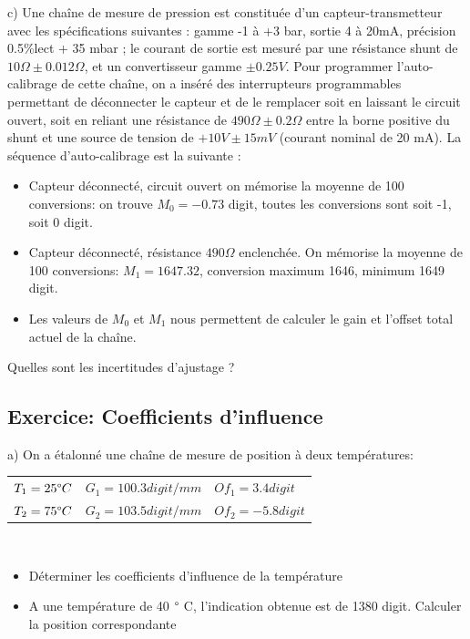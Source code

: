 \documentclass[main.tex]{subfiles}
\begin{document}
c)	Une chaîne de mesure de pression est constituée d'un capteur-transmetteur avec les spécifications suivantes : gamme -1 à +3 bar, sortie 4 à 20mA, précision 0.5\%lect + 35 mbar ; le courant de sortie est mesuré par une résistance shunt de $10 \Omega \pm 0.012 \Omega$, et un convertisseur gamme $\pm 0.25V$.
Pour programmer l'auto-calibrage de cette chaîne, on a inséré des interrupteurs programmables permettant de déconnecter le capteur et de le remplacer soit en laissant le circuit ouvert, soit en reliant une résistance de $490 \Omega \pm 0.2 \Omega$ entre la borne positive du shunt et une source de tension de $+10V \pm 15mV$ (courant nominal de 20 mA). La séquence d'auto-calibrage est la suivante :
\begin{itemize}
    \item Capteur déconnecté, circuit ouvert on mémorise la moyenne de 100 conversions: on trouve $M_0=-0.73$ digit, toutes les conversions sont soit -1, soit 0 digit.
    \item Capteur déconnecté, résistance $490 \Omega$ enclenchée. On mémorise la moyenne de 100 conversions: $M_1=1647.32$, conversion maximum 1646, minimum 1649 digit.
    \item Les valeurs de $M_0$ et $M_1$ nous permettent de calculer le gain et l'offset total actuel de la chaîne.
\end{itemize}

Quelles sont les incertitudes d'ajustage ?

\subsection{Exercice: Coefficients d'influence}

a)	On a étalonné une chaîne de mesure de position à deux températures:


\begin {center}
\begin{tabular}{lll}
    $T_1=25 \degree C$ & $G_1= 100.3 digit/mm$  & $Of_1 = 3.4 digit$  \\
    $T_2=75 \degree C$ & $G_2 = 103.5 digit/mm$ & $Of_2 = -5.8 digit$ \\
\end{tabular}
\end{center}
~\\
\begin{itemize}
    \item Déterminer les coefficients d'influence de la température
    \item A une température de 40 $\degree$ C, l'indication obtenue est de 1380 digit. Calculer la position correspondante
\end{itemize}
~\\
\end{document}
